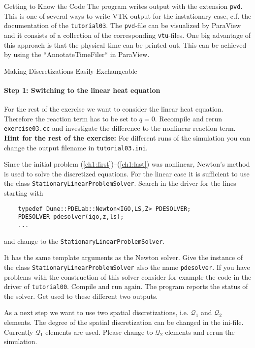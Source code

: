 \documentclass[12pt,a4paper]{article}
\begin{document}
\begin{Exercise}{Getting to Know the Code}
  The program writes output with the extension \lstinline!pvd!. This is one
  of several ways to write VTK output for the instationary case,
  c.f. the documentation of the \lstinline!tutorial03!. The
  \lstinline!pvd!-file can be visualized by ParaView and it consists of
  a collection of the corresponding \lstinline!vtu!-files.
  One big advantage of this approach is that the physical time can be
  printed out. This can be achieved by using the ``AnnotateTimeFiler``
  in ParaView.
\end{Exercise}

\begin{Exercise}{Making Discretizations Easily Exchangeable}
  \vspace{-2em}
  \paragraph{Step 1: Switching to the linear heat equation}
  For the rest of the exercise we want to consider the linear heat
  equation. Therefore the reaction term has to be set to $q =
  0$. Recompile and rerun \lstinline!exercise03.cc! and investigate the
  difference to the nonlinear reaction term. \newline
  \textbf{Hint for the rest of the exercise:} For different runs of the
  simulation you can change the output filename in
  \lstinline!tutorial03.ini!.

  Since the initial problem (\ref{ch1:first})--(\ref{ch1:last}) was
  nonlinear, Newton's method is used to solve the discretized
  equations. For the linear case it is sufficient to use the class
  \lstinline!StationaryLinearProblemSolver!. Search in the driver for
  the lines starting with
  \begin{lstlisting}
    typedef Dune::PDELab::Newton<IGO,LS,Z> PDESOLVER;
    PDESOLVER pdesolver(igo,z,ls);
    ...
  \end{lstlisting}
  and change to the \lstinline!StationaryLinearProblemSolver!.

  It has the same template arguments as the Newton solver. Give the
  instance of the class \lstinline!StationaryLinearProblemSolver! also
  the name \lstinline!pdesolver!. If you have problems with the
  construction of this solver consider for example the code in the
  driver of \lstinline!tutorial00!. Compile and run again. The program
  reports the status of the solver. Get used to these different two
  outputs.

  As a next step we want to use two spatial discretizations,
  i.e. $\mathcal{Q}_1$ and $\mathcal{Q}_2$ elements. The degree of the
  spatial discretization can be changed in the ini-file. Currently
  $\mathcal{Q}_1$ elements are used. Please change to $\mathcal{Q}_2$
  elements and rerun the simulation.


\end{Exercise}
\end{document}
